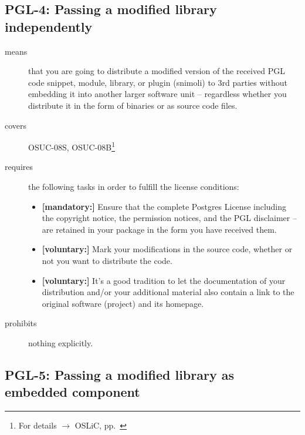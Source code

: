 \subsection{PGL-4: Passing a modified library independently}
\label{OSUC-08S-PGL}\label{OSUC-08B-PGL}
\begin{description}

\item[means] that you are going to distribute a modified version of the received
PGL code snippet, module, library, or plugin (snimoli) to 3rd parties without
embedding it into another larger software unit -- regardless whether you
distribute it in the form of binaries or as source code files.

\item[covers] OSUC-08S, OSUC-08B\footnote{For details $\rightarrow$ OSLiC, pp.\
\pageref{OSUC-08B-DEF}}

\item[requires] the following tasks in order to fulfill the license conditions:
\begin{itemize}
  \item \textbf{[mandatory:]} Ensure that the complete Postgres License
  including the copyright notice, the permission notices, and the PGL disclaimer
  -- are retained in your package in the form you have received them.
  \item \textbf{[voluntary:]} Mark your modifications in the source code,
  whether or not you want to distribute the code.
  \item \textbf{[voluntary:]} It's a good tradition to let the documentation of
  your distribution and/or your additional material also contain a link to the
  original software (project) and its homepage.
\end{itemize}

\item[prohibits] nothing explicitly.

\end{description}


\subsection{PGL-5: Passing a modified library as embedded component}
\label{OSUC-10S-PGL} \label{OSUC-10B-PGL}

